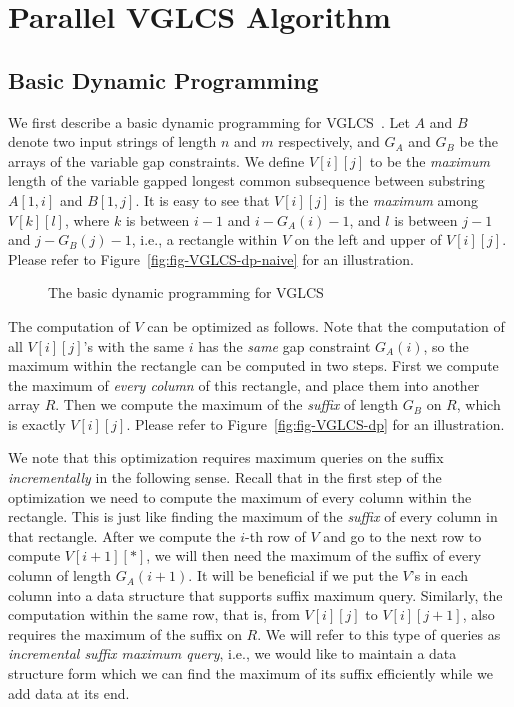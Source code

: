 \section{Parallel VGLCS Algorithm} \label{sec:parallelVGLCS}

\subsection{Basic Dynamic Programming}

We first describe a basic dynamic programming for
VGLCS~\cite{Peng2011TheLC}. Let $A$ and $B$ denote two input strings of
length $n$ and $m$ respectively, and $G_A$ and $G_B$ be the arrays of
the variable gap constraints.  We define $V[i][j]$ to be the {\em
maximum} length of the variable gapped longest common subsequence
between substring $A[1, i]$ and $B[1, j]$.  It is easy to see that
$V[i][j]$ is the {\em maximum} among $V[k][l]$, where $k$ is between
$i-1$ and $i-G_A(i)-1$, and $l$ is between $j-1$ and $j-G_B(j)-1$, i.e.,
a rectangle within $V$ on the left and upper of $V[i][j]$.  Please refer
to Figure~\ref{fig:fig-VGLCS-dp-naive} for an illustration.

\begin{figure}[!thb]
  \centering {} 
  \caption{The basic dynamic programming for VGLCS}
  \label{fig:basic-dp-VGLCS}
\end{figure}

The computation of $V$ can be optimized as follows.  Note that the
computation of all $V[i][j]$'s with the same $i$ has the {\em same} gap
constraint $G_A(i)$, so the maximum within the rectangle can be computed
in two steps.  First we compute the maximum of {\em every column} of
this rectangle, and place them into another array $R$. Then we compute
the maximum of the {\em suffix} of length $G_B$ on $R$, which is exactly
$V[i][j]$.  Please refer to Figure~\ref{fig:fig-VGLCS-dp} for an
illustration.

We note that this optimization requires maximum queries on the suffix
{\em incrementally} in the following sense.  Recall that in the first
step of the optimization we need to compute the maximum of every column
within the rectangle.  This is just like finding the maximum of the {\em
suffix} of every column in that rectangle.  After we compute the $i$-th
row of $V$ and go to the next row to compute $V[i+1][*]$, we will then
need the maximum of the suffix of every column of length $G_A(i+1)$. It
will be beneficial if we put the $V$'s in each column into a data
structure that supports suffix maximum query. Similarly, the computation
within the same row, that is, from $V[i][j]$ to $V[i][j+1]$, also
requires the maximum of the suffix on $R$.  We will refer to this type
of queries as {\em incremental suffix maximum query}, i.e., we would
like to maintain a data structure form which we can find the maximum of
its suffix efficiently while we add data at its end.

